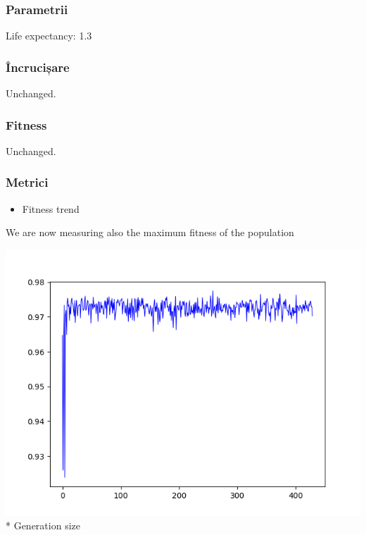 \documentclass[11pt]{article}
\makeatletter
\def\maxwidth{\ifdim\Gin@nat@width>\linewidth\linewidth
    \else\Gin@nat@width\fi}
\let\Oldincludegraphics\includegraphics
\renewcommand{\includegraphics}[1]{\Oldincludegraphics[width=.8\maxwidth]{#1}}
\providecommand{\tightlist}{%
      \setlength{\itemsep}{0pt}\setlength{\parskip}{0pt}}
\makeatother
\begin{document}
\hypertarget{parametrii}{%
\subsubsection{Parametrii}\label{parametrii}}

Life expectancy: 1.3

\hypertarget{uxeencruciux219are}{%
\subsubsection{Încrucișare}\label{uxeencruciux219are}}

Unchanged.

\hypertarget{fitness}{%
\subsubsection{Fitness}\label{fitness}}

Unchanged.

\hypertarget{metrici}{%
\subsubsection{Metrici}\label{metrici}}

\begin{itemize}
\tightlist
\item
  Fitness trend
\end{itemize}

We are now measuring also the maximum fitness of the population

\includegraphics{gfx/fitness-trend-tne-2.png} * Generation size
\end{document}

